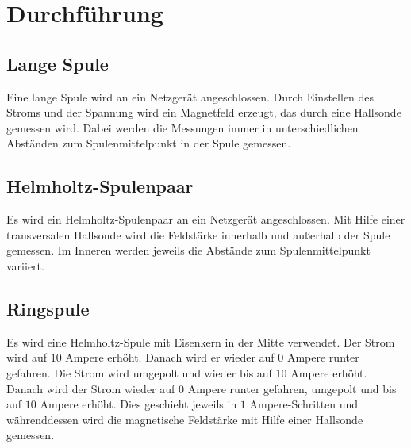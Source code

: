 \section{Durchführung}
\label{sec:Durchführung}

\subsection{Lange Spule}
\label{sec:langeSpule}
Eine lange Spule wird an ein Netzgerät angeschlossen. Durch Einstellen des Stroms und der Spannung
wird ein Magnetfeld erzeugt, das durch eine Hallsonde gemessen wird. Dabei werden die Messungen immer
in unterschiedlichen Abständen zum Spulenmittelpunkt in der Spule gemessen.

\subsection{Helmholtz-Spulenpaar}
\label{sec:helmholtz}
Es wird ein Helmholtz-Spulenpaar an ein Netzgerät angeschlossen. Mit Hilfe einer transversalen Hallsonde
wird die Feldstärke innerhalb und außerhalb der Spule gemessen. Im Inneren werden jeweils die Abstände
zum Spulenmittelpunkt variiert.

\subsection{Ringspule}
\label{sec:ringspule}
Es wird eine Helmholtz-Spule mit Eisenkern in der Mitte verwendet. Der Strom wird
auf $10$ Ampere erhöht. Danach wird er wieder auf $0$ Ampere runter gefahren. Die Strom wird umgepolt
und wieder bis auf $10$ Ampere erhöht. Danach wird der Strom wieder auf $0$ Ampere runter gefahren, umgepolt
und bis auf $10$ Ampere erhöht. Dies geschieht jeweils in $1$ Ampere-Schritten und währenddessen wird die
magnetische Feldstärke mit Hilfe einer Hallsonde gemessen.
